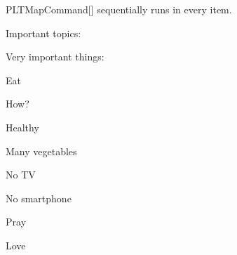 \documentclass[a4paper, 11pt]{article}
\begin{document}
\begin{macro}{PLTMapCommand}[]
     sequentially runs  in every item.
\end{macro}

\begin{example}{}
    Important topics: \PLTMapCommand{\showwithbullet}
\end{example}

\begin{example}{}

    \begin{importantlisting}
        Very important things:\par
        \item Eat%
        \begin{importantlisting}
            How?
            \item Healthy
            \item Many vegetables
            \item No TV
            \item No smartphone
        \end{importantlisting}
        \par
        \item Pray\par
        \item Love\par
    \end{importantlisting}
\end{example}
\end{document}
